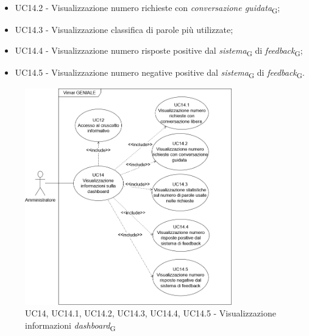 \begin{itemize}
\begin{itemize}
        \item UC14.2 - Visualizzazione numero richieste con \textit{conversazione guidata}\textsubscript{G};
        \item UC14.3 - Visualizzazione classifica di parole più utilizzate;
        \item UC14.4 - Visualizzazione numero risposte positive dal \textit{sistema}\textsubscript{G} di \textit{feedback}\textsubscript{G};
        \item UC14.5 - Visualizzazione numero negative positive dal \textit{sistema}\textsubscript{G} di \textit{feedback}\textsubscript{G}.
    \end{itemize}
\end{itemize}
\begin{figure}[H]
\centering
\includegraphics[width=0.8\textwidth]{contents/casi_duso/png/UC14.png}
\caption{UC14, UC14.1, UC14.2, UC14.3, UC14.4, UC14.5 - Visualizzazione informazioni \textit{dashboard}\textsubscript{G}}
\end{figure}

